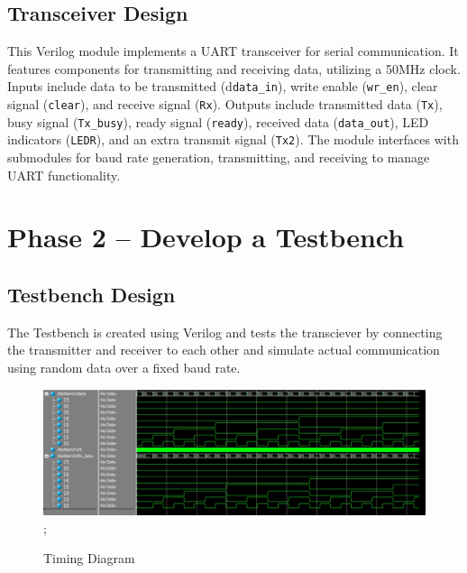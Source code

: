 \documentclass{article}
\begin{document}
                    \subsection{Transceiver Design}

                    This Verilog module implements a UART transceiver for serial communication. It features components for transmitting and receiving data, utilizing a 50MHz clock. Inputs include data to be transmitted (d\texttt{data\_in}), write enable (\texttt{wr\_en}), clear signal (\texttt{clear}), and receive signal (\texttt{Rx}). Outputs include transmitted data (\texttt{Tx}), busy signal (\texttt{Tx\_busy}), ready signal (\texttt{ready}), received data (\texttt{data\_out}), LED indicators (\texttt{LEDR}), and an extra transmit signal (\texttt{Tx2}). The module interfaces with submodules for baud rate generation, transmitting, and receiving to manage UART functionality.
                    
                        

                \section{Phase 2 – Develop a Testbench}
                \subsection{Testbench Design}
                    The Testbench is created using Verilog and tests the transciever by connecting the transmitter and receiver to each other and simulate actual communication using random data over a fixed baud rate.
            
                    
                    
                    \begin{figure}[!htb]
                        \centering
                            {\includegraphics[width=14cm]{wave.jpg}};
                            \caption{Timing Diagram}
                    \end{figure}
                            
\end{document}
